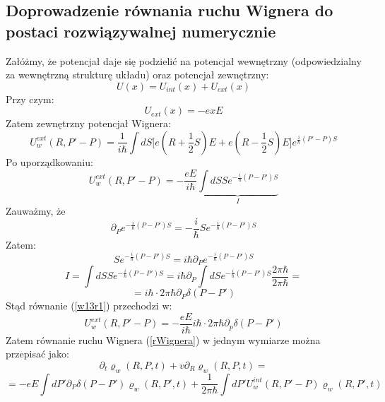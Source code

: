 \subsection{Doprowadzenie równania ruchu Wignera do postaci rozwiązywalnej numerycznie}
Załóżmy, że potencjał daje się podzielić na potencjał wewnętrzny (odpowiedzialny za wewnętrzną strukturę układu) oraz potencjał zewnętrzny:
\begin{equation}U(x)=U_{int}(x)+U_{ext}(x)
\end{equation}
Przy czym:
\begin{equation}U_{ext}(x)=-exE\end{equation}
Zatem zewnętrzny potencjał Wignera:
\begin{equation}
U_w^{ext}(R,P'-P)=\frac{1}{i\hbar}\int dS \big[ e(R+\frac{1}{2}S)E+e(R-\frac{1}{2}S)E \big]e^{\frac{i}{\hbar}(P'-P)S}
\end{equation}
Po uporządkowaniu:
\begin{equation}
U_w^{ext}(R,P'-P)=-\frac{eE}{i\hbar}\underbrace{\int dS Se^{-\frac{i}{\hbar}(P-P')S}}_{I} \label{w13r1}
\end{equation}
Zauważmy, że
\begin{equation}
\partial_P e^{-\frac{i}{\hbar}(P-P')S}=-\frac{i}{\hbar}Se^{-\frac{i}{\hbar}(P-P')S}
\end{equation}
Zatem:
\begin{equation}
Se^{-\frac{i}{\hbar}(P-P')S}=i\hbar\partial_P e^{-\frac{i}{\hbar}(P-P')S}
\end{equation}
\begin{equation}
 I=\int dS Se^{-\frac{i}{\hbar}(P-P')S}=
 i\hbar\partial_P \int dS e^{-\frac{i}{\hbar}(P-P')S}\frac{2\pi\hbar}{2\pi\hbar}=
 \nonumber
 \end{equation}
 \begin{equation}
= i\hbar\cdot 2\pi\hbar\partial_P\delta(P-P')
 \end{equation}
 Stąd równanie (\ref{w13r1}) przechodzi w:
 \begin{equation}
 U_w^{ext}(R,P'-P)=-\frac{eE}{i\hbar}i\hbar\cdot 2\pi\hbar\partial_p\delta(P-P')
 \end{equation}
 Zatem równanie ruchu Wignera (\ref{rWignera}) w jednym wymiarze można przepisać jako:
\begin{equation}
\partial_t\varrho_w(R,P,t)+
v\partial_R \varrho_w(R,P,t)
=\nonumber
\end{equation}
\begin{equation}=-eE\int dP' \partial_P\delta(P-P') \varrho_w(R,P',t)
+\frac{1}{2\pi\hbar}\int dP' U_w^{int}(R,P'-P)\varrho_w(R,P',t)
\end{equation}

